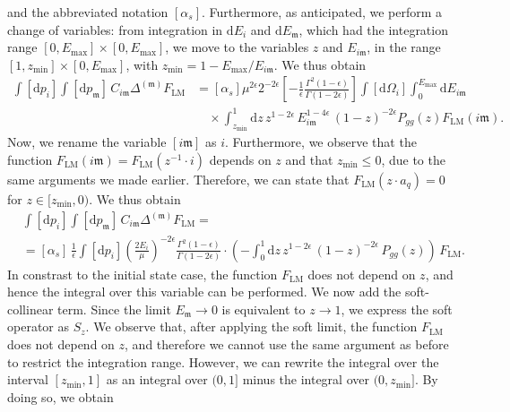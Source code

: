 \documentclass[a4paper, 12pt]{book}
\newcommand{\um}{\mathfrak{m}}
\begin{document}
and the abbreviated notation $[\alpha_s]$. Furthermore, as anticipated, we perform a change of variables: from integration in $\mathrm{d}E_i$ and $\mathrm{d}E_\um$, which had the integration range $[0,E_{\mathrm{max}}]\times [0,E_{\mathrm{max}}]$, we move to the variables $z$ and $E_{i\um}$, in the range $[1,z_{\mathrm{min}}]\times [0,E_{\mathrm{max}}]$, with $z_{\mathrm{min}}=1-E_{\mathrm{max}}/E_{i\um}$. We thus obtain
\begin{align}
  \int [\mathrm{d}p_i] \int [\mathrm{d}p_\um] \, C_{i\um} \Delta^{(\um)} F_{\mathrm{LM}} 
  &= [\alpha_s] \mu^{2\epsilon}2^{-2\epsilon}\left[- \frac{1}{\epsilon} \frac{\Gamma^2(1-\epsilon)}{\Gamma(1-2\epsilon)} \right] \int [\mathrm{d}\Omega_i]\int_0^{E_{\mathrm{max}}} \mathrm{d}E_{i\um} \nonumber \\
  &\quad \times \int_{z_{\mathrm{min}}}^{1} \mathrm{d}z \, z^{1-2\epsilon} \, E_{i\um}^{1-4\epsilon} \,(1-z)^{-2\epsilon}P_{gg}(z)F_{\mathrm{LM}}(i\um) .
\end{align}
Now, we rename the variable $[i\um]$ as $i$. Furthermore, we observe that the function $F_{\mathrm{LM}}(i\um)=F_{\mathrm{LM}}(z^{-1}\cdot i)$ depends on $z$ and that $z_{\mathrm{min}}\leq0$, due to the same arguments we made earlier. Therefore, we can state that $F_{\mathrm{LM}}(z \cdot a_q) = 0$ for $z \in [z_{\mathrm{min}}, 0)$. We thus obtain
\begin{equation}
  \begin{split}
  & \int [\mathrm{d}p_i] \int [\mathrm{d}p_\um] \, C_{i\um} \Delta^{(\um)} F_{\mathrm{LM}} = \\
  & = [\alpha_s] \, \frac{1}{\epsilon} \int[\mathrm{d}p_i] \left(\frac{2E_i}{\mu} \right)^{-2\epsilon} \frac{\Gamma^2(1-\epsilon)}{\Gamma(1-2\epsilon)} \cdot \left( - \int_0^1 \mathrm{d}z \, z^{1-2\epsilon} \, (1-z)^{-2\epsilon} \, P_{gg}(z)\right) \, F_{\mathrm{LM}} .
  \end{split}
\end{equation}
In constrast to the initial state case, the function $F_{\mathrm{LM}}$ does not depend on $z$, and hence the integral over this variable can be performed. We now add the soft-collinear term. Since the limit $E_{\um} \to 0$ is equivalent to $z \to 1$, we express the soft operator as $S_z$. We observe that, after applying the soft limit, the function $F_{\mathrm{LM}}$ does not depend on $z$, and therefore we cannot use the same argument as before to restrict the integration range. However, we can rewrite the integral over the interval $[z_{\mathrm{min}},1]$ as an integral over $(0,1]$ minus the integral over $(0,z_{\mathrm{min}}]$. By doing so, we obtain
\end{document}
